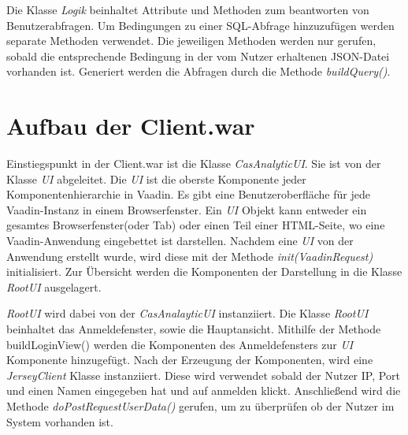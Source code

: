 Die Klasse \textit{Logik} beinhaltet Attribute und Methoden zum beantworten von Benutzerabfragen. Um Bedingungen zu einer SQL-Abfrage hinzuzufügen werden separate Methoden verwendet. Die jeweiligen Methoden werden nur gerufen, sobald die entsprechende Bedingung in der vom Nutzer erhaltenen JSON-Datei vorhanden ist. Generiert werden die Abfragen durch die Methode \textit{buildQuery()}. 

\section{Aufbau der Client.war}
\label{ch:Umsetzung:sec:clientwar}

Einstiegspunkt in der Client.war ist die Klasse \textit{CasAnalyticUI}. Sie ist von der Klasse \textit{UI} abgeleitet. Die \textit{UI} ist die oberste Komponente jeder Komponentenhierarchie in Vaadin. Es gibt eine Benutzeroberfläche für jede Vaadin-Instanz in einem Browserfenster. Ein \textit{UI} Objekt kann entweder ein gesamtes Browserfenster(oder Tab) oder einen Teil einer HTML-Seite, wo eine Vaadin-Anwendung eingebettet ist darstellen. Nachdem eine \textit{UI} von der Anwendung erstellt wurde, wird diese mit der Methode \textit{init(VaadinRequest)} initialisiert. Zur Übersicht werden die Komponenten der Darstellung in die Klasse \textit{RootUI} ausgelagert. 

\textit{RootUI} wird dabei von der \textit{CasAnalayticUI} instanziiert. Die Klasse \textit{RootUI} beinhaltet das Anmeldefenster, sowie die Hauptansicht. Mithilfe der Methode buildLoginView() werden die Komponenten des Anmeldefensters zur \textit{UI} Komponente hinzugefügt. Nach der Erzeugung der Komponenten, wird eine \textit{JerseyClient} Klasse instanziiert. Diese wird verwendet sobald der Nutzer IP, Port und einen Namen eingegeben hat und auf anmelden klickt. Anschließend wird die Methode \textit{doPostRequestUserData()} gerufen, um zu überprüfen ob der Nutzer im System vorhanden ist. 

